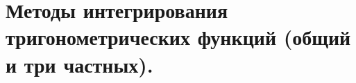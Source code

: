 \documentclass[../main.tex]{subfiles}
\begin{document}
\newpage
\section{Методы интегрирования тригонометрических функций (общий и три частных).}
\end{document}
